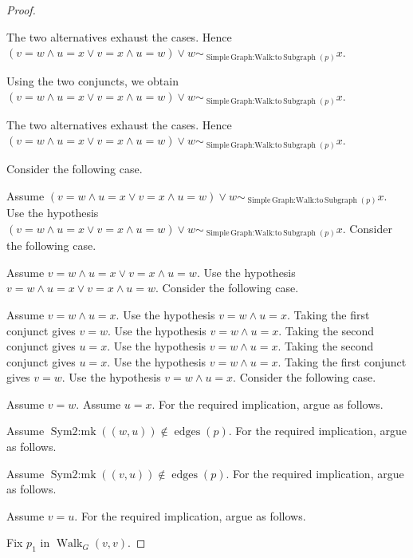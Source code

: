 \documentclass{article}
\theoremstyle{paperresult}
\newenvironment{proofstep}{\par\smallskip\ifdim\leftskip<3em\relax\advance\leftskip by 1em\relax\fi\noindent\ignorespaces}{\par\smallskip}
\begin{document}
\begin{proof}
\begin{proofstep}
\begin{proofstep}
\begin{proofstep}
\begin{proofstep}
\begin{proofstep}
The two alternatives exhaust the cases. Hence \((v = w \land u = x \lor v = x \land u = w) \lor w \sim_{\operatorname{Simple\,Graph\mathord{:}Walk\mathord{:}to\,Subgraph}(p)} x\).
\end{proofstep}
Using the two conjuncts, we obtain \((v = w \land u = x \lor v = x \land u = w) \lor w \sim_{\operatorname{Simple\,Graph\mathord{:}Walk\mathord{:}to\,Subgraph}(p)} x\).
\end{proofstep}
The two alternatives exhaust the cases. Hence \((v = w \land u = x \lor v = x \land u = w) \lor w \sim_{\operatorname{Simple\,Graph\mathord{:}Walk\mathord{:}to\,Subgraph}(p)} x\).
\end{proofstep}
Consider the following case.
\begin{proofstep}
Assume \((v = w \land u = x \lor v = x \land u = w) \lor w \sim_{\operatorname{Simple\,Graph\mathord{:}Walk\mathord{:}to\,Subgraph}(p)} x\).
Use the hypothesis \((v = w \land u = x \lor v = x \land u = w) \lor w \sim_{\operatorname{Simple\,Graph\mathord{:}Walk\mathord{:}to\,Subgraph}(p)} x\).
Consider the following case.
\begin{proofstep}
Assume \(v = w \land u = x \lor v = x \land u = w\).
Use the hypothesis \(v = w \land u = x \lor v = x \land u = w\).
Consider the following case.
\begin{proofstep}
Assume \(v = w \land u = x\).
Use the hypothesis \(v = w \land u = x\).
Taking the first conjunct gives \(v = w\).
Use the hypothesis \(v = w \land u = x\).
Taking the second conjunct gives \(u = x\).
Use the hypothesis \(v = w \land u = x\).
Taking the second conjunct gives \(u = x\).
Use the hypothesis \(v = w \land u = x\).
Taking the first conjunct gives \(v = w\).
Use the hypothesis \(v = w \land u = x\).
Consider the following case.
\begin{proofstep}
Assume \(v = w\).
Assume \(u = x\).
For the required implication, argue as follows.
\begin{proofstep}
Assume \(\operatorname{Sym2\mathord{:}mk}\left(\left(w, u\right)\right) \notin \operatorname{edges}\left(p\right)\).
For the required implication, argue as follows.
\begin{proofstep}
Assume \(\operatorname{Sym2\mathord{:}mk}\left(\left(v, u\right)\right) \notin \operatorname{edges}\left(p\right)\).
For the required implication, argue as follows.
\begin{proofstep}
Assume \(v = u\).
For the required implication, argue as follows.
\begin{proofstep}
Fix \(p_{1}\) in \(\operatorname{Walk}_{G}(v, v)\).

\end{proofstep}
\end{proofstep}
\end{proofstep}
\end{proofstep}
\end{proofstep}
\end{proofstep}
\end{proofstep}
\end{proofstep}
\end{proofstep}
\end{proofstep}
\end{proof}
\end{document}
